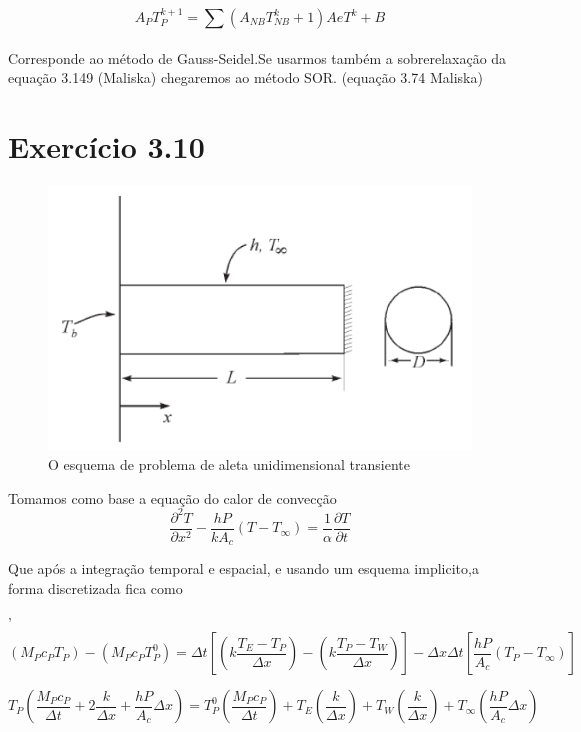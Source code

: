 \documentclass[]{article}
\begin{document}
\begin{equation}
	A_P T_P^{k+1} = \sum \left( A_{NB} T_{NB} ^k+1 \right) AeT^{k}+ B
\end{equation}\\
 
Corresponde ao método de Gauss-Seidel.Se usarmos também a sobrerelaxação da equação 3.149 (Maliska) chegaremos ao método SOR. (equação 3.74 Maliska)


\section*{Exercício 3.10}


 \begin{figure}[H]
 	\centering
 	\includegraphics[width=.65\textwidth]{figures/310-1}
 	\caption{O esquema de problema de aleta unidimensional transiente}
 \end{figure}
Tomamos como base a equação do calor de convecção
\begin{equation}
	\frac{\partial^2 T}{\partial x^2} - \frac{hP}{k A_c} (T - T_\infty) = \frac{1}{\alpha} \frac{\partial T}{\partial t}
\end{equation}

Que após a integração temporal e espacial, e usando um esquema implicito,a forma discretizada fica como

'\begin{equation}
	(M_P c_P T_P) - (M_P c_P T_P^0) = \Delta t \left[ \left( k \frac{T_E - T_P}{\Delta x} \right) - \left( k \frac{T_P - T_W}{\Delta x} \right) \right] 
	- \Delta x \Delta t \left[ \frac{hP}{A_c} (T_P - T_\infty) \right]
\end{equation}

\begin{equation}
	T_P \left( \frac{M_P c_P}{\Delta t} + 2 \frac{k}{\Delta x} + \frac{hP}{A_c} \Delta x \right) =
	T_P^0 \left( \frac{M_P c_P}{\Delta t} \right) +
	T_E \left( \frac{k}{\Delta x} \right) +
	T_W \left( \frac{k}{\Delta x} \right) +
	T_\infty \left( \frac{hP}{A_c} \Delta x \right)
\end{equation}
\end{document}
